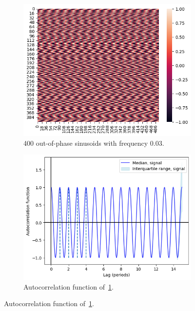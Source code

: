 \begin{figure}
  \centering
  \begin{subfigure}[t]{0.45\textwidth}
  \centering
    \includegraphics[width=\linewidth]{sinusoids_outofphase}
    \caption{
      400 out-of-phase sinusoids with frequency 0.03.
    }
    \label{fig:acf-sinusoids-nonoise-ts}
  \end{subfigure}%
  \centering
  \begin{subfigure}[t]{0.45\textwidth}
  \centering
    \includegraphics[width=\linewidth]{sinusoids_outofphase_acf_corrected}
    \caption{
      Autocorrelation function of~\ref{fig:acf-sinusoids-nonoise-ts}.
    }
    \label{fig:acf-sinusoids-nonoise-acf}
  \end{subfigure}


\end{figure}
